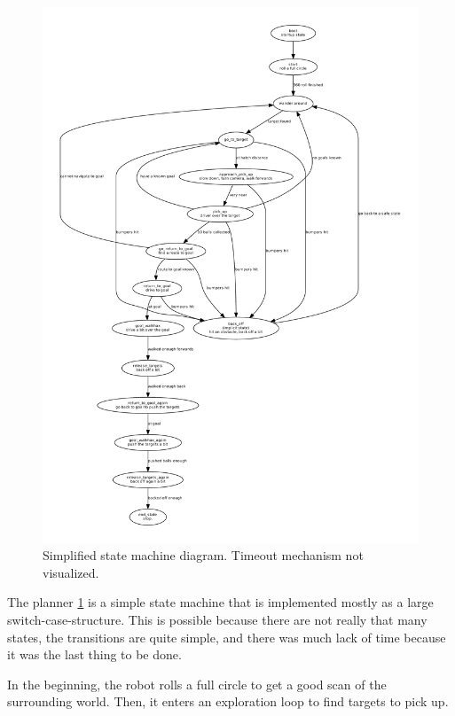 \documentclass[a4paper,10pt]{article}
\begin{document}
\begin{figure}[!]	%
\begin{center}
\includegraphics[width=12.0cm]{fsrfsm.pdf}
\caption{Simplified state machine diagram. Timeout mechanism not visualized.}
\label{fsm} %
\end{center}
\end{figure}

The planner \ref{fsm} is a simple state machine that is implemented mostly as a large switch-case-structure. This is possible because there are not really that many states, the transitions are quite simple, and there was much lack of time because it was the last thing to be done.

In the beginning, the robot rolls a full circle to get a good scan of the surrounding world. Then, it enters an exploration loop to find targets to pick up.
\end{document}
